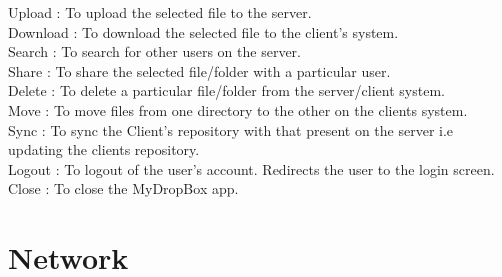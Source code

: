 \documentclass[]{article}
\begin{document}
Upload		: To upload the selected file to the server.\\
Download		: To download the selected file to the client's system.\\
Search		: To search for other users on the server.\\
Share		: To share the selected file/folder with a particular user.\\
Delete		: To delete a particular file/folder from the server/client system.\\
Move			: To move files from one directory to the other on the clients system.\\
Sync			: To sync the Client's repository with that present on the server i.e updating the clients repository.\\
Logout		: To logout of the user's account. Redirects the user to the login screen.\\
Close		
: To close the MyDropBox app.

\section{\LARGE Network}
\end{document}
